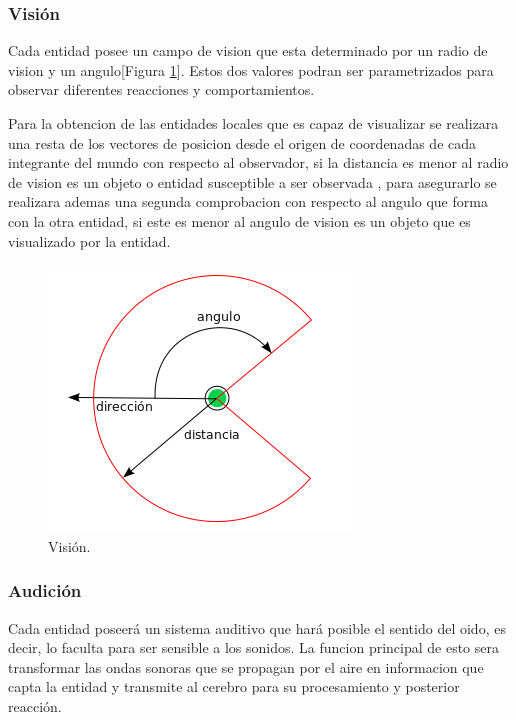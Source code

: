 \subsubsection{Visión}
\label{sec:vision}

Cada entidad posee un campo de vision que esta determinado por un radio de vision y un angulo[Figura \ref{fig:../images/angulo_vision.png}]. Estos dos valores podran ser parametrizados para observar diferentes reacciones y comportamientos. 

Para la obtencion de las entidades locales que es capaz de visualizar se realizara una resta de los vectores de posicion desde el origen de coordenadas de cada integrante del mundo con respecto al observador, si la distancia es menor al radio de vision es un objeto o entidad susceptible a ser observada , para asegurarlo se realizara ademas una segunda comprobacion con respecto al angulo que forma con la otra entidad, si este  es menor al angulo de vision es un objeto que es visualizado por la entidad.

\begin{figure}[h]
 \centering
 \includegraphics[scale=0.8]{../images/angulo_vision.png}
 \caption{Visión.}
 \label{fig:../images/angulo_vision.png}
\end{figure}


\subsubsection{Audición}
\label{sec:audicion}

Cada entidad poseerá un sistema auditivo que hará posible el sentido del oido, es decir, lo faculta para ser sensible a los sonidos. La funcion principal de esto sera transformar las ondas sonoras que se propagan por el aire en informacion que capta la entidad y transmite al cerebro para su procesamiento y posterior reacción.


